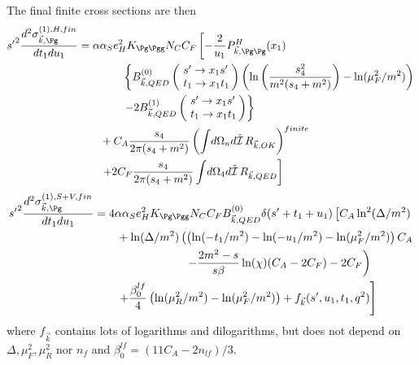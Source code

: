 The final finite cross sections are then
\begin{align}
{s'}^2\frac{d^2\sigma_{\vec k,\Pg}^{(1),H,fin}}{dt_1du_1} &=\alpha\alpha_Se_H^2K_{\Pg\Pgg}N_CC_F\left[-\frac 2 {u_1}P^H_{\vec k,\Pg\Pg}(x_1)\right. \nonumber\\
 &\hspace{40pt}\left\{ B^{(0)}_{\vec k,QED}\left(\!\begin{array}{l}s'\rightarrow x_1s'\\t_1\rightarrow x_1 t_1\end{array}\!\!\right) \left(\ln\left(\frac{s_4^2}{m^2(s_4+m^2)}\right)-\ln(\mu_F^2/m^2)\right)\right. \nonumber\\
 &\hspace{40pt}\left.-2B^{(1)}_{\vec k,QED}\left(\!\begin{array}{l}s'\rightarrow x_1s'\\t_1\rightarrow x_1 t_1\end{array}\!\!\right)\right\} \nonumber\\
 &\hspace{20pt}+C_A\frac{s_4}{2\pi(s_4+m^2)}\left(\int\!d\Omega_nd\hat{\mathcal I}\,R_{\vec k,OK}\right)^{finite} \nonumber\\
 &\hspace{20pt}\left.+2C_F\frac{s_4}{2\pi(s_4+m^2)}\int\!d\Omega_4d\hat{\mathcal I}\,R_{\vec k,QED}\right]
\end{align}
\begin{align}
{s'}^2\frac{d^2\sigma_{\vec k,\Pg}^{(1),S+V,fin}}{dt_1du_1} &=4\alpha\alpha_Se_H^2K_{\Pg\Pgg}N_CC_FB^{(0)}_{\vec k,QED}\delta(s'+t_1+u_1)\left[C_A\ln^2(\Delta/m^2) \right.\nonumber\\
 &\hspace{20pt} + \ln(\Delta/m^2)\left(\left(\ln(-t_1/m^2)-\ln(-u_1/m^2)-\ln(\mu_F^2/m^2)\right)C_A \right. \nonumber\\
 &\hspace{80pt} \left. - \frac{2m^2-s}{s\beta}\ln(\chi)(C_A-2C_F) - 2C_F\right) \nonumber\\
 &\hspace{20pt}\left. + \frac {\beta_0^{lf}}{4}\left(\ln(\mu_R^2/m^2)- \ln(\mu_F^2/m^2)\right) +  f_{\vec k}(s',u_1,t_1,q^2)\right]
\end{align}
where $f_{\vec k}$ contains lots of logarithms and dilogarithms, but does not depend on $\Delta,\mu_F^2,\mu_R^2$ nor $n_f$ and $\beta_0^{lf} = (11C_A - 2n_{lf})/3$.
